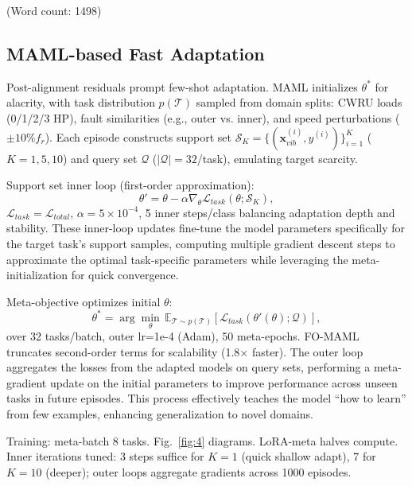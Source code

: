 (Word count: 1498)

\subsection{MAML-based Fast Adaptation}
\label{subsec:maml_adaptation}

Post-alignment residuals prompt few-shot adaptation. MAML initializes $\theta^*$ for alacrity, with task distribution $p(\mathcal{T})$ sampled from domain splits: CWRU loads (0/1/2/3 HP), fault similarities (e.g., outer vs. inner), and speed perturbations ($\pm 10\% f_r$). Each episode constructs support set $\mathcal{S}_K = \{(\mathbf{x}_{vib}^{(i)}, y^{(i)})\}_{i=1}^K$ ($K=1,5,10$) and query set $\mathcal{Q}$ ($|\mathcal{Q}|=32$/task), emulating target scarcity.

Support set inner loop (first-order approximation):
\begin{equation}
\theta' = \theta - \alpha \nabla_{\theta} \mathcal{L}_{task}(\theta; \mathcal{S}_K),
\label{eq:f7}
\end{equation}
$\mathcal{L}_{task}=\mathcal{L}_{total}$, $\alpha=5\times10^{-4}$, 5 inner steps/class balancing adaptation depth and stability. These inner-loop updates fine-tune the model parameters specifically for the target task's support samples, computing multiple gradient descent steps to approximate the optimal task-specific parameters while leveraging the meta-initialization for quick convergence.

Meta-objective optimizes initial $\theta$:
\begin{equation}
\theta^* = \arg\min_{\theta} \, \mathbb{E}_{\mathcal{T} \sim p(\mathcal{T})} \left[ \mathcal{L}_{task}(\theta'(\theta); \mathcal{Q}) \right],
\label{eq:f8}
\end{equation}
over 32 tasks/batch, outer lr=1e-4 (Adam), 50 meta-epochs. FO-MAML truncates second-order terms for scalability (1.8$\times$ faster). The outer loop aggregates the losses from the adapted models on query sets, performing a meta-gradient update on the initial parameters to improve performance across unseen tasks in future episodes. This process effectively teaches the model ``how to learn'' from few examples, enhancing generalization to novel domains.

Training: meta-batch 8 tasks. Fig.~\ref{fig:4} diagrams. LoRA-meta halves compute. Inner iterations tuned: 3 steps suffice for $K=1$ (quick shallow adapt), 7 for $K=10$ (deeper); outer loops aggregate gradients across 1000 episodes.

